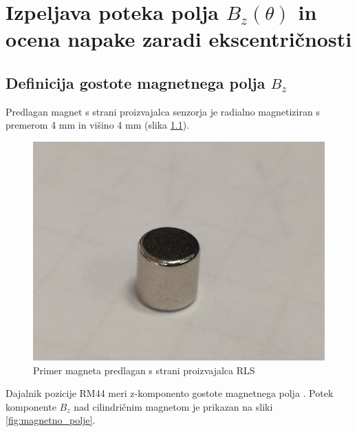 

\chapter{Izpeljava poteka polja $B_z(\theta)$ in ocena napake zaradi ekscentričnosti}


\section{Definicija  gostote magnetnega polja $B_z$}

Predlagan magnet s strani proizvajalca senzorja je radialno magnetiziran s premerom 4 mm in višino 4 mm (slika \ref{magnet4mm}).
\begin{figure}[h]
	\centering
	\includegraphics[width=0.75\columnwidth]{./Slike/magnet4mm.png}
	\caption{Primer magneta predlagan s strani proizvajalca RLS}
	\label{magnet4mm}
\end{figure}
Dajalnik pozicije RM44 meri z-komponento gostote magnetnega polja \cite{AM8192}. Potek komponente $B_z$ nad cilindričnim magnetom je prikazan na sliki \ref{fig:magnetno_polje}.

